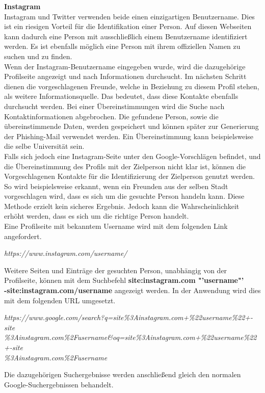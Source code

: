 			\textbf{Instagram}\\
			Instagram und Twitter verwenden beide einen einzigartigen Benutzername. Dies ist ein riesigen Vorteil für die Identifikation einer Person. Auf diesen Webseiten kann dadurch eine Person mit ausschließlich einem Benutzername identifiziert werden. Es ist ebenfalls möglich eine Person mit ihrem offiziellen Namen zu suchen und zu finden.\\
			Wenn der Instagram-Benutzername eingegeben wurde, wird die dazugehörige Profilseite angezeigt und nach Informationen durchsucht. Im nächsten Schritt dienen die vorgeschlagenen Freunde, welche in Beziehung zu diesem Profil stehen, als weitere Informationsquelle. Das bedeutet, dass diese Kontakte ebenfalls durchsucht werden. Bei einer Übereinstimmungen wird die Suche nach Kontaktinformationen abgebrochen. Die gefundene Person, sowie die übereinstimmende Daten, werden gespeichert und können später zur Generierung  der Phishing-Mail verwendet werden. Ein Übereinstimmung kann beispielsweise die selbe Universität sein.\\
			Falls sich jedoch eine Instagram-Seite unter den Google-Vorschlägen befindet, und die Übereinstimmung des Profils mit der Zielperson nicht klar ist, können die Vorgeschlagenen Kontakte für die Identifizierung der Zielperson genutzt werden. So wird beispielsweise erkannt, wenn ein Freunden aus der selben Stadt vorgeschlagen wird, dass es sich um die gesuchte Person handeln kann. Diese Methode erzielt kein sicheres Ergebnis. Jedoch kann die Wahrscheinlichkeit erhöht werden, dass es sich um die richtige Person handelt.\\
			Eine Profilseite mit bekanntem Username  wird mit dem folgenden Link angefordert.
			
			\textit{https://www.instagram.com/username/}
			
			Weitere Seiten und Einträge der gesuchten Person, unabhängig von der Profilseite, können mit dem Suchbefehl \textbf{site:instagram.com "'username"' \\ -site:instagram.com/username} angezeigt werden. \cite{Bazzell} In der Anwendung wird dies mit dem folgenden URL umgesetzt.
					
			\textit{https://www.google.com/search?q=site\%3Ainstagram.com+\%22username\%22+-site\\
				\%3Ainstagram.com\%2Fusername\&oq=site\%3Ainstagram.com+\%22username\%22+-site\\
				\%3Ainstagram.com\%2Fusername}
			
			Die dazugehörigen Suchergebnisse werden anschließend gleich den normalen Google-Suchergebnissen behandelt.
			
